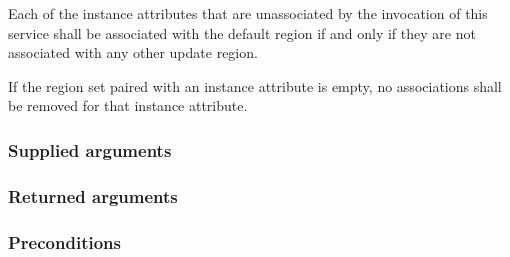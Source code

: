 \begin{compactstdpage}
    Each of the instance attributes that are unassociated by the invocation of this service shall be associated with the default region if and only if they are not associated with any other update region.

    If the region set paired with an instance attribute is empty, no associations shall be removed for that instance attribute.

    \subsubsection{Supplied arguments}


    \subsubsection{Returned arguments}


    \subsubsection{Preconditions}


\end{compactstdpage}

\clearpage

